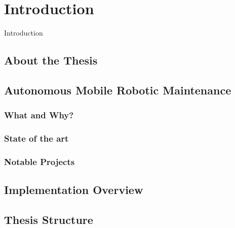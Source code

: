 \chapter{Introduction}
\label{chp:introduction} 

Introduction
\section{About the Thesis}

\section{Autonomous Mobile Robotic Maintenance}

\subsection{What and Why?}

\subsection{State of the art}

\subsection{Notable Projects}

\section{Implementation Overview}

\section{Thesis Structure}